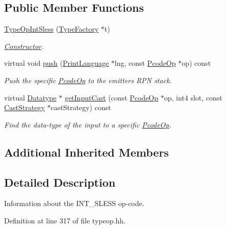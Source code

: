 \subsection*{Public Member Functions}
\begin{DoxyCompactItemize}
\item 
\mbox{\hyperlink{class_type_op_int_sless_a6784e2b152b201f6282285919f347875}{Type\+Op\+Int\+Sless}} (\mbox{\hyperlink{class_type_factory}{Type\+Factory}} $\ast$t)
\begin{DoxyCompactList}\small\item\em \mbox{\hyperlink{class_constructor}{Constructor}}. \end{DoxyCompactList}\item 
virtual void \mbox{\hyperlink{class_type_op_int_sless_a3b88a12e1da476a9d382cd9843ca7df5}{push}} (\mbox{\hyperlink{class_print_language}{Print\+Language}} $\ast$lng, const \mbox{\hyperlink{class_pcode_op}{Pcode\+Op}} $\ast$op) const
\begin{DoxyCompactList}\small\item\em Push the specific \mbox{\hyperlink{class_pcode_op}{Pcode\+Op}} to the emitter\textquotesingle{}s R\+PN stack. \end{DoxyCompactList}\item 
virtual \mbox{\hyperlink{class_datatype}{Datatype}} $\ast$ \mbox{\hyperlink{class_type_op_int_sless_a7a75f536f0be6ff417f9eb6d83b27a3b}{get\+Input\+Cast}} (const \mbox{\hyperlink{class_pcode_op}{Pcode\+Op}} $\ast$op, int4 slot, const \mbox{\hyperlink{class_cast_strategy}{Cast\+Strategy}} $\ast$cast\+Strategy) const
\begin{DoxyCompactList}\small\item\em Find the data-\/type of the input to a specific \mbox{\hyperlink{class_pcode_op}{Pcode\+Op}}. \end{DoxyCompactList}\end{DoxyCompactItemize}
\subsection*{Additional Inherited Members}


\subsection{Detailed Description}
Information about the I\+N\+T\+\_\+\+S\+L\+E\+SS op-\/code. 

Definition at line 317 of file typeop.\+hh.



